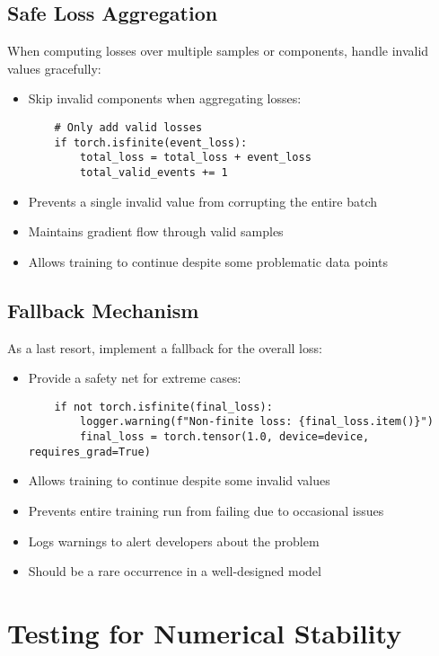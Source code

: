 \subsection{Safe Loss Aggregation}

When computing losses over multiple samples or components, handle invalid values gracefully:

\begin{itemize}
    \item Skip invalid components when aggregating losses:
    \begin{verbatim}
    # Only add valid losses
    if torch.isfinite(event_loss):
        total_loss = total_loss + event_loss
        total_valid_events += 1
    \end{verbatim}
    \item Prevents a single invalid value from corrupting the entire batch
    \item Maintains gradient flow through valid samples
    \item Allows training to continue despite some problematic data points
\end{itemize}

\subsection{Fallback Mechanism}

As a last resort, implement a fallback for the overall loss:

\begin{itemize}
    \item Provide a safety net for extreme cases:
    \begin{verbatim}
    if not torch.isfinite(final_loss):
        logger.warning(f"Non-finite loss: {final_loss.item()}")
        final_loss = torch.tensor(1.0, device=device, requires_grad=True)
    \end{verbatim}
    \item Allows training to continue despite some invalid values
    \item Prevents entire training run from failing due to occasional issues
    \item Logs warnings to alert developers about the problem
    \item Should be a rare occurrence in a well-designed model
\end{itemize}

\section{Testing for Numerical Stability}

